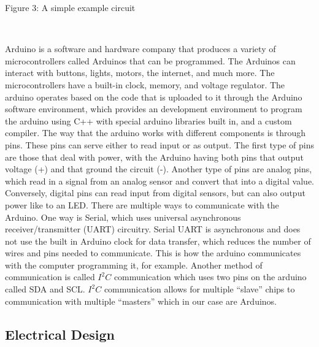 \documentclass[12pt,]{article}
\begin{document}
Figure 3: A simple example circuit

~

Arduino is a software and hardware company that produces a variety of
microcontrollers called Arduinos that can be programmed. The Arduinos
can interact with buttons, lights, motors, the internet, and much more.
The microcontrollers have a built-in clock, memory, and voltage
regulator. The arduino operates based on the code that is uploaded to it
through the Arduino software environment, which provides an development
environment to program the arduino using C++ with special arduino
libraries built in, and a custom compiler. The way that the arduino
works with different components is through pins. These pins can serve
either to read input or as output. The first type of pins are those that
deal with power, with the Arduino having both pins that output voltage
(+) and that ground the circuit (-). Another type of pins are analog
pins, which read in a signal from an analog sensor and convert that into
a digital value. Conversely, digital pins can read input from digital
sensors, but can also output power like to an LED. There are multiple
ways to communicate with the Arduino. One way is Serial, which uses
universal asynchronous receiver/transmitter (UART) circuitry. Serial
UART is asynchronous and does not use the built in Arduino clock for
data transfer, which reduces the number of wires and pins needed to
communicate. This is how the arduino communicates with the computer
programming it, for example. Another method of communication is called
\(I^2C\) communication which uses two pins on the arduino called SDA and
SCL. \(I^2C\) communication allows for multiple ``slave'' chips to
communication with multiple ``masters'' which in our case are Arduinos.

\subsection{Electrical Design}\label{electrical-design}
\end{document}
